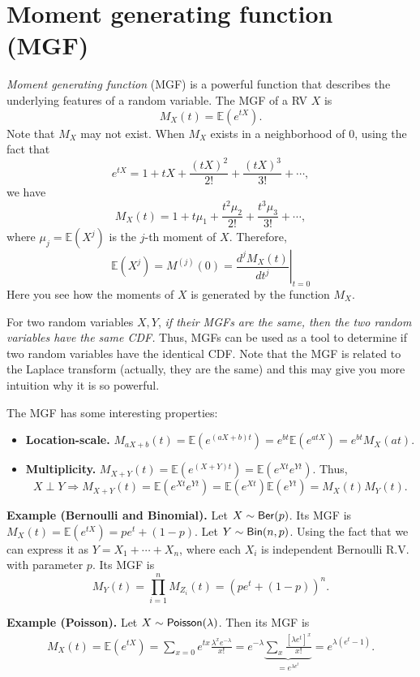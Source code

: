 \documentclass[twoside]{article}
\newcommand\E{\mathbb{E}}
\begin{document}
\section{Moment generating function (MGF)}

\emph{Moment generating function} (MGF) is a
powerful function that describes the underlying features of a random variable. 
The MGF of a RV $X$ is
$$
M_X(t) = \E(e^{tX}).
$$
Note that $M_X$ may not exist. 
When $M_X$ exists in a neighborhood of $0$, 
using the fact that
$$
e^{tX} = 1+tX+\frac{(tX)^2}{2!}+\frac{(tX)^3}{3!}+\cdots,
$$ 
we have
$$
M_X(t) = 1 + t\mu_1 + \frac{t^2\mu_2}{2!}+ \frac{t^3\mu_3}{3!}+\cdots,
$$
where $\mu_j = \E(X^j)$ is the $j$-th moment of $X$. 
Therefore,
$$
\E(X^j) = M^{(j)}(0) = \left. \frac{d^j M_X(t)}{dt^j}\right|_{t=0}
$$
Here you see how the moments of $X$ is generated by the function $M_X$. 

For two random variables $X,Y$, \emph{if their MGFs are the same,
then the two random variables have the same CDF.}
Thus, MGFs can be used as a tool to determine if two random variables 
have the identical CDF. 
Note that the MGF is related to the Laplace transform (actually, they are the same)
and this may give you more intuition why it is so powerful. 


The MGF has some interesting properties: 
\begin{itemize}
\item {\bf Location-scale.} $M_{aX+b}(t) = \E(e^{(aX+b)t}) = e^{bt} \E(e^{atX}) = e^{bt}M_{X}(at)$. 

\item {\bf Multiplicity. } $M_{X+Y}(t) = \E(e^{(X+Y)t}) = \E(e^{Xt} e^{Yt})$. 
Thus,
$$
X\perp Y \Rightarrow M_{X+Y}(t) = \E(e^{Xt} e^{Yt}) = \E(e^{Xt})\E( e^{Yt}) = M_X(t)M_Y(t).
$$
\end{itemize}



{\bf Example (Bernoulli and Binomial). }
Let $X\sim {\sf Ber}(p)$. 
Its MGF is $M_X(t) = \E(e^{tX}) = pe^t + (1-p)$. 
Let $Y\sim {\sf Bin}(n,p)$.
Using the fact that we can express it as $Y=X_1+\cdots+X_n$, where each $X_i$ is independent Bernoulli R.V. with parameter $p$.
Its MGF is 
$$
M_Y(t) = \prod_{i=1}^n M_{Z_i}(t) = ( pe^t + (1-p))^n.
$$


{\bf Example (Poisson). }
Let $X\sim {\sf Poisson}(\lambda)$.
Then its MGF is 
\begin{align*}
M_X(t) = \E(e^{tX}) = \sum_{x=0} e^{tx} \frac{\lambda^x e^{-\lambda}}{x!} = e^{-\lambda} \underbrace{\sum_x \frac{[\lambda e^t]^x }{x!}}_{= e^{\lambda e^t}} = e^{\lambda(e^t-1)}.
\end{align*}
\end{document}
